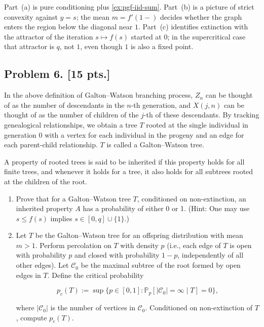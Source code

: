 \documentclass[11pt,a4paper]{article}
\begin{document}
\begin{remark}
\label{rem:p5-checks}
Part~(a) is pure conditioning plus \cref{ex:pgf-iid-sum}. Part~(b) is a picture of strict convexity against \(y=s\); the mean \(m=f'(1-)\) decides whether the graph enters the region below the diagonal near \(1\). Part~(c) identifies extinction with the attractor of the iteration \(s\mapsto f(s)\) started at \(0\); in the supercritical case that attractor is \(q\), not \(1\), even though \(1\) is also a fixed point.
\end{remark}

\subsection{Problem 6. [15 pts.]}
In the above definition of Galton--Watson branching process, \( Z_n \) can be thought of as the number of descendants in the \( n \)-th generation, and \( X(j, n) \) can be thought of as the number of children of the \( j \)-th of these descendants. By tracking genealogical relationships, we obtain a tree \( T \) rooted at the single individual in generation 0 with a vertex for each individual in the progeny and an edge for each parent-child relationship. \( T \) is called a Galton--Watson tree.

A property of rooted trees is said to be inherited if this property holds for all finite trees, and whenever it holds for a tree, it also holds for all subtrees rooted at the children of the root.
\begin{enumerate}[label=(\alph*)]
    \item Prove that for a Galton--Watson tree \( T \), conditioned on non-extinction, an inherited property \( A \) has a probability of either 0 or 1. (Hint: One may use \( s \le f(s) \) implies \( s \in [0, q] \cup \{1\} \).)
    \item Let \( T \) be the Galton--Watson tree for an offspring distribution with mean \( m > 1 \). Perform percolation on \( T \) with density \( p \) (i.e., each edge of \( T \) is open with probability \( p \) and closed with probability \( 1 - p \), independently of all other edges). Let \( \mathcal{C}_0 \) be the maximal subtree of the root formed by open edges in \( T \). Define the critical probability

    \[
    p_c(T) := \sup\{p \in [0, 1] : \mathbb{P}_p[|\mathcal{C}_0| = \infty \mid T] = 0\},
    \]

    where \( |\mathcal{C}_0| \) is the number of vertices in \( \mathcal{C}_0 \). Conditioned on non-extinction of \( T \), compute \( p_c(T) \).
\end{enumerate}
\end{document}
